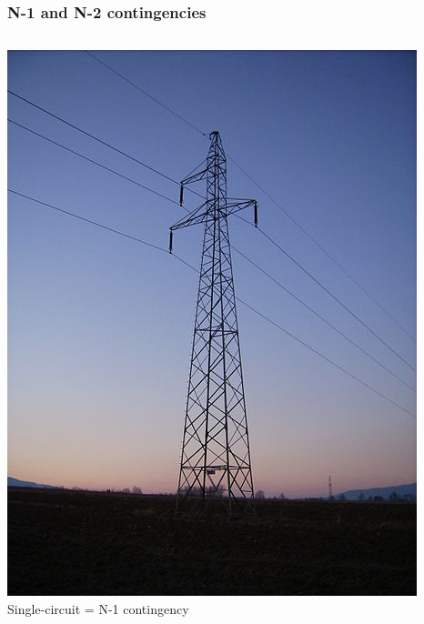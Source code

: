 \documentclass[compress]{beamer}
\begin{document}
\begin{frame}
  \frametitle{N-1 and N-2 contingencies}
  \begin{columns}
\begin{column}{0.45\textwidth}
\includegraphics[width=\textwidth]{Figs/SingleCircuit-3phase.JPG}\\
Single-circuit = N-1 contingency
\end{column}
\begin{column}{0.45\textwidth}

\end{column}
\end{columns}
\end{frame}
\end{document}
